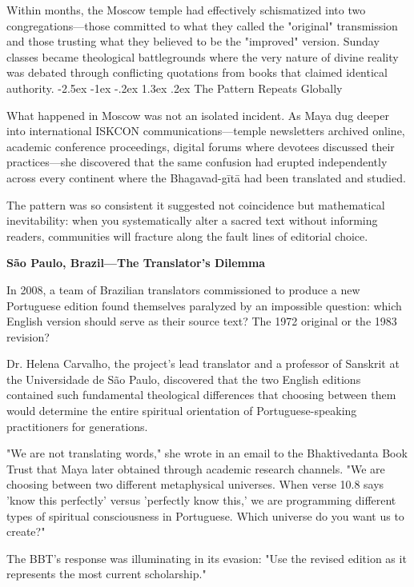 \documentclass[12pt,twoside]{book}
\makeatletter
\renewcommand\section{\@startsection{section}{1}{\z@}%
{-2.5ex \@plus -1ex \@minus -.2ex}%
{1.3ex \@plus.2ex}%
{\normalfont\Large\bfseries}}
\makeatother
\begin{document}
Within months, the Moscow temple had effectively schismatized into two congregations—those committed to what they called the "original" transmission and those trusting what they believed to be the "improved" version. Sunday classes became theological battlegrounds where the very nature of divine reality was debated through conflicting quotations from books that claimed identical authority.
\section{The Pattern Repeats Globally}
\label{sec:org0b2ceff}

What happened in Moscow was not an isolated incident. As Maya dug deeper into international ISKCON communications—temple newsletters archived online, academic conference proceedings, digital forums where devotees discussed their practices—she discovered that the same confusion had erupted independently across every continent where the Bhagavad-gītā had been translated and studied.

The pattern was so consistent it suggested not coincidence but mathematical inevitability: when you systematically alter a sacred text without informing readers, communities will fracture along the fault lines of editorial choice.

\textbf{\textbf{São Paulo, Brazil—The Translator's Dilemma}}

In 2008, a team of Brazilian translators commissioned to produce a new Portuguese edition found themselves paralyzed by an impossible question: which English version should serve as their source text? The 1972 original or the 1983 revision?

Dr. Helena Carvalho, the project's lead translator and a professor of Sanskrit at the Universidade de São Paulo, discovered that the two English editions contained such fundamental theological differences that choosing between them would determine the entire spiritual orientation of Portuguese-speaking practitioners for generations.

"We are not translating words," she wrote in an email to the Bhaktivedanta Book Trust that Maya later obtained through academic research channels. "We are choosing between two different metaphysical universes. When verse 10.8 says 'know this perfectly' versus 'perfectly know this,' we are programming different types of spiritual consciousness in Portuguese. Which universe do you want us to create?"

The BBT's response was illuminating in its evasion: "Use the revised edition as it represents the most current scholarship."
\end{document}
